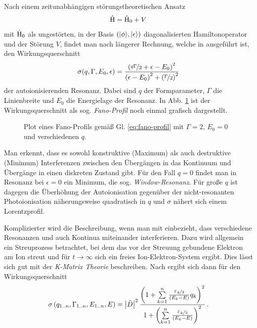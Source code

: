 Nach einem zeitunabhängigen störungstheoretischen Ansatz
\begin{equation}\label{eq:uebergang_diskret_kontinuum_hamilton}
	\hat{\mathrm{H}}=\hat{\mathrm{H}}_0+V
\end{equation}
mit $\hat{\mathrm{H}}_0$ als ungestörten, in der Basis
$\left(|{\phi}\rangle\text{,}\,|{\epsilon}\rangle\right)$ diagonalisierten
Hamiltonoperator und der Störung $V$, findet man nach längerer Rechnung,
welche in \cite{fano:1961:PhysRev.124.1866} ausgeführt ist, den
Wirkungsquerschnitt
\begin{equation}\label{eq:fano-profil}
	\sigma(q,\Gamma,E_0,\epsilon)=\frac{\left(\nicefrac{q\Gamma}{2}+\epsilon-E_0\right)^2}{\left(\epsilon-E_0\right)^2+\left(\nicefrac{\Gamma}{2}\right)^2}
\end{equation}
der autoionisierenden Resonanz. Dabei sind $q$ der Formparameter, $\Gamma$ die
Linienbreite und $E_0$ die Energielage der Resonanz. In Abb. \ref{fig:fano} ist
der Wirkungsquerschnitt als sog. \textit{Fano-Profil} noch einmal grafisch
dargestellt.
\begin{figure}
	\centering
	\footnotesize
	
	\caption[Fano-Profil]{Plot eines Fano-Profils gemäß Gl.
	\eqref{eq:fano-profil} mit $\Gamma=2$, $E_0=0$ und verschiedenen
	$q$.}
	\label{fig:fano}
\end{figure}
Man erkennt, dass es sowohl konstruktive (Maximum) als auch destruktive
(Minimum) Interferenzen zwischen den Übergängen in das Kontinuum und Übergänge
in einen diskreten Zustand gibt. Für den Fall $q=0$ findet man in Resonanz
bei $\epsilon=0$ ein Minimum, die sog. \textit{Window-Resonanz}. Für große $q$
ist dagegen die Überhöhung der Autoionisation gegenüber der nicht-resonanten
Photoionisation näherungsweise quadratisch in $q$ und $\sigma$ nähert sich einem Lorentzprofil.\par
Komplizierter wird die Beschreibung, wenn man mit einbezieht, dass verschiedene
Resonanzen und auch Kontinua miteinander interferieren. Dazu wird allgemein ein
Streuprozess betrachtet, bei dem das vor der Streuung gebundene Elektron am
Ion streut und für $t\to\infty$ sich ein freies Ion-Elektron-System ergibt. Dies
lässt sich gut mit der \textit{K-Matrix Theorie} beschreiben. Nach
\cite{connerade:1998:highly_excited_atoms} ergibt sich dann für den
Wirkungsquerschnitt
\begin{equation}\label{eq:k-matrix_wirkungsquerschnitt}
	\sigma\left(q_{1..n},\Gamma_{1..n},E_{1..n},E\right)=\left|\tilde{D}\right|^2\frac{\left(1+\sum\limits_{k=1}^n{\frac{\nicefrac{\Gamma_k}{2}}{\left(E_k-E\right)}q_k}\right)^2}{1+\left(\sum\limits_{k=1}^n{\frac{\nicefrac{\Gamma_k}{2}}{\left(E_k-E\right)}}\right)^2}\,.
\end{equation}
